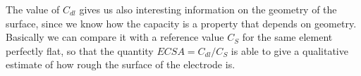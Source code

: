 \nt
{
    The value of $C_{dl}$ gives us also interesting information on the geometry of the surface, since we know how the capacity is a property that depends on geometry. Basically we can compare it with a reference value $C_S$ for the same element perfectly flat, so that the quantity $ECSA = C_{dl}/C_S$ is able to give a qualitative estimate of how rough the surface of the electrode is.
}